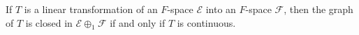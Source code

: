 If $T$ is a linear transformation of an $F$-space $\mathcal{E}$ into an $F$-space $\mathcal{F}$, then the graph of $T$ is closed in $\mathcal{E} \oplus_1 \mathcal{F}$ if and only if $T$ is continuous.
